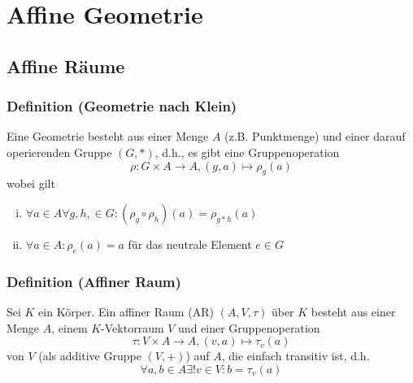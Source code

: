\chapter{Affine Geometrie}
\section{Affine Räume}

\subsection{Definition (Geometrie nach Klein)}
\begin{Definition}[Geometrie]
	Eine Geometrie besteht aus einer Menge $ A $ (z.B. Punktmenge) und einer darauf operierenden Gruppe $ (G,*) $, d.h.,
	es gibt eine Gruppenoperation
		\[ \rho: G\times A\to A,(g,a)\mapsto \rho_g(a)  \]
	wobei gilt
		\begin{enumerate}[(i)]
			\item $ \forall a\in A\forall g,h,\in G:(\rho_g\circ \rho_h)(a) = \rho_{g*h}(a) $
			\item $ \forall a\in A:\rho_e(a) = a $ für das neutrale Element $ e \in G $
		\end{enumerate}
\end{Definition}

\subsection{Definition (Affiner Raum)}
\begin{Definition}
	Sei $ K $ ein Körper. Ein affiner Raum (AR) $ (A,V,\tau) $ über $ K $ besteht aus einer Menge $ A $, einem $ K $-Vektorraum $ V $ und einer Gruppenoperation
		\[ \tau:V\times A\to A,(v,a)\mapsto \tau_v(a) \]
	von $ V $ (als additive Gruppe $ (V,+) $) auf $ A $, die einfach transitiv ist, d.h.
		\[ \forall a,b\in A\exists!v\in V:b=\tau_v(a) \]
\end{Definition}

